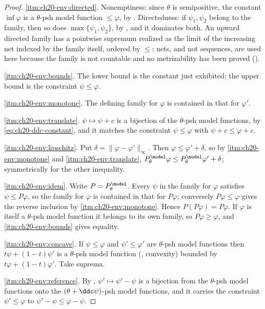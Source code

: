 \begin{proof}
\cref{itm:ch20-env:directed}.  Nonemptiness: since \(\theta\) is
semipositive, the constant \(\inf\varphi\) is a \(\theta\)-psh model
function \(\leq\varphi\), by .  Directedness: if
\(\psi_1,\psi_2\) belong to the family, then so does
\(\max\{\psi_1,\psi_2\}\), by , and it dominates
both.  An upward directed family has a pointwise supremum realized as the
limit of the increasing net indexed by the family itself, ordered by
\(\leq\); nets, and not sequences, are used here because the family is not
countable and no metrizability has been proved
().

\cref{itm:ch20-env:bounds}.  The lower bound is the constant just exhibited;
the upper bound is the constraint \(\psi\leq\varphi\).

\cref{itm:ch20-env:monotone}.  The defining family for \(\varphi\) is
contained in that for \(\varphi'\).

\cref{itm:ch20-env:translate}.  \(\psi\mapsto\psi+c\) is a bijection of the
\(\theta\)-psh model functions, by \eqref{eq:ch20-ddc-constant}, and it
matches the constraint \(\psi\leq\varphi\) with \(\psi+c\leq\varphi+c\).

\cref{itm:ch20-env:lipschitz}.  Put \(\delta=\|\varphi-\varphi'\|_\infty\).
Then \(\varphi\leq\varphi'+\delta\), so by
\cref{itm:ch20-env:monotone} and \cref{itm:ch20-env:translate},
\(P^{\model}_\theta\varphi\leq P^{\model}_\theta\varphi'+\delta\);
symmetrically for the other inequality.

\cref{itm:ch20-env:idem}.  Write \(P=P^{\model}_\theta\).  Every \(\psi\) in
the family for \(\varphi\) satisfies \(\psi\leq P\varphi\), so the family
for \(\varphi\) is contained in that for \(P\varphi\); conversely
\(P\varphi\leq\varphi\) gives the reverse inclusion by
\cref{itm:ch20-env:monotone}.  Hence \(P(P\varphi)=P\varphi\).  If
\(\varphi\) is itself a \(\theta\)-psh model function it belongs to its own
family, so \(P\varphi\geq\varphi\), and \cref{itm:ch20-env:bounds} gives
equality.

\cref{itm:ch20-env:concave}.  If \(\psi\leq\varphi\) and
\(\psi'\leq\varphi'\) are \(\theta\)-psh model functions then
\(t\psi+(1-t)\psi'\) is a \(\theta\)-psh model function
(, convexity) bounded by
\(t\varphi+(1-t)\varphi'\).  Take suprema.

\cref{itm:ch20-env:reference}.  By ,
\(\psi'\mapsto\psi'-\psi\) is a bijection from the \(\theta\)-psh model
functions onto the \((\theta+\ddc\psi)\)-psh model functions, and it carries
the constraint \(\psi'\leq\varphi\) to \(\psi'-\psi\leq\varphi-\psi\).
\end{proof}

